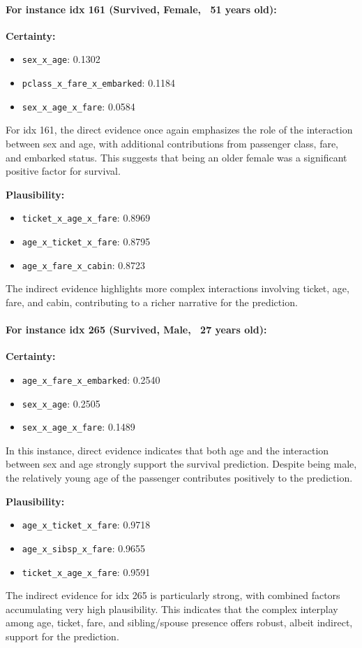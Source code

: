 \documentclass[acmlarge]{acmart}
\begin{document}
\paragraph{For instance idx 161 (Survived, Female, ~51 years old):}  
\newline 
\textbf{Certainty:}
\begin{itemize}
    \item \texttt{sex\_x\_age}: 0.1302
    \item \texttt{pclass\_x\_fare\_x\_embarked}: 0.1184
    \item \texttt{sex\_x\_age\_x\_fare}: 0.0584
\end{itemize}
For idx 161, the direct evidence once again emphasizes the role of the interaction between sex and age, with additional contributions from passenger class, fare, and embarked status. This suggests that being an older female was a significant positive factor for survival.

\textbf{Plausibility:}
\begin{itemize}
    \item \texttt{ticket_x_age_x_fare}: 0.8969
    \item \texttt{age\_x\_ticket\_x\_fare}: 0.8795
    \item \texttt{age\_x\_fare\_x\_cabin}: 0.8723
\end{itemize}
The indirect evidence highlights more complex interactions involving ticket, age, fare, and cabin, contributing to a richer narrative for the prediction.

\paragraph{For instance idx 265 (Survived, Male, ~27 years old):}  
\newline 
\textbf{Certainty:}
\begin{itemize}
    \item \texttt{age\_x\_fare\_x\_embarked}: 0.2540
    \item \texttt{sex\_x\_age}: 0.2505
    \item \texttt{sex\_x\_age\_x\_fare}: 0.1489
\end{itemize}
In this instance, direct evidence indicates that both age and the interaction between sex and age strongly support the survival prediction. Despite being male, the relatively young age of the passenger contributes positively to the prediction.

\textbf{Plausibility:}
\begin{itemize}
    \item \texttt{age\_x\_ticket\_x\_fare}: 0.9718
    \item \texttt{age\_x\_sibsp\_x\_fare}: 0.9655
    \item \texttt{ticket_x_age_x_fare}: 0.9591

\end{itemize}
The indirect evidence for idx 265 is particularly strong, with combined factors accumulating very high plausibility. This indicates that the complex interplay among age, ticket, fare, and sibling/spouse presence offers robust, albeit indirect, support for the prediction.
\end{document}
